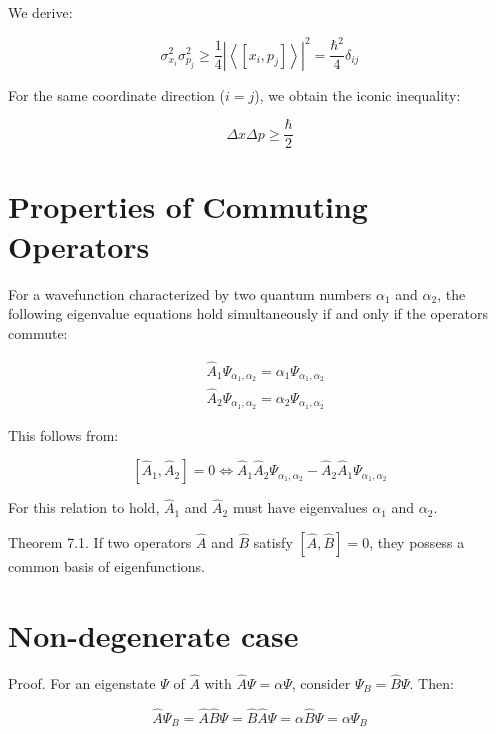 We derive:

\begin{equation}
\sigma_{x_{i}}^{2} \sigma_{p_{j}}^{2} \geq \frac{1}{4}\left|\left\langle\left[x_{i}, p_{j}\right]\right\rangle\right|^{2}=\frac{\hbar^{2}}{4} \delta_{i j}
\end{equation}

For the same coordinate direction ($i=j$), we obtain the iconic inequality:

\begin{equation}
\Delta x \Delta p \geq \frac{\hbar}{2}
\end{equation}

\section{Properties of Commuting Operators}
For a wavefunction characterized by two quantum numbers $\alpha_1$ and $\alpha_2$, the following eigenvalue equations hold simultaneously if and only if the operators commute:

\begin{align}
& \hat{A}_{1} \Psi_{\alpha_{1}, \alpha_{2}}=\alpha_{1} \Psi_{\alpha_{1}, \alpha_{2}} \\
& \hat{A}_{2} \Psi_{\alpha_{1}, \alpha_{2}}=\alpha_{2} \Psi_{\alpha_{1}, \alpha_{2}}
\end{align}

This follows from:

\begin{equation}
\left[\hat{A}_{1}, \hat{A}_{2}\right]=0 \Longleftrightarrow \hat{A}_{1} \hat{A}_{2} \Psi_{\alpha_{1}, \alpha_{2}}-\hat{A}_{2} \hat{A}_{1} \Psi_{\alpha_{1}, \alpha_{2}}
\end{equation}

For this relation to hold, $\hat{A}_1$ and $\hat{A}_2$ must have eigenvalues $\alpha_1$ and $\alpha_2$.

Theorem 7.1. If two operators $\hat{A}$ and $\hat{B}$ satisfy $[\hat{A}, \hat{B}]=0$, they possess a common basis of eigenfunctions.

\section{Non-degenerate case}
Proof. For an eigenstate $\Psi$ of $\hat{A}$ with $\hat{A} \Psi=\alpha \Psi$, consider $\Psi_{B}=\hat{B} \Psi$. Then:

\begin{equation}
\hat{A} \Psi_{B}=\hat{A} \hat{B} \Psi=\hat{B} \hat{A} \Psi=\alpha \hat{B} \Psi=\alpha \Psi_{B}
\end{equation}

